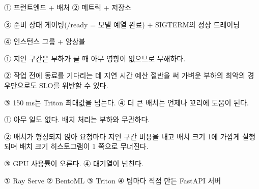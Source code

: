 
\begin{tbboptions}
  \item ① 프런트엔드 + 배처        ② 메트릭 + 저장소
  \item ③ 준비 상태 게이팅(/ready = 모델 예열 완료) + SIGTERM의 정상 드레이닝
  \item ④ 인스턴스 그룹 + 앙상블
\end{tbboptions}


\begin{tbboptions}
  \item ① 지연 구간은 부하가 클 때 아무 영향이 없으므로 무해하다.
  \item ② 작업 전에 동료를 기다리는 데 지연 시간 예산 절반을 써 가벼운 부하의 최악의 경우만으로도 SLO를 위반할 수 있다.
  \item ③ 150 ms는 Triton 최대값을 넘는다.        ④ 더 큰 배치는 언제나 꼬리에 도움이 된다.
\end{tbboptions}


\begin{tbboptions}
  \item ① 아무 일도 없다. 배치 처리는 부하와 무관하다.
  \item ② 배치가 형성되지 않아 요청마다 지연 구간 비용을 내고 배치 크기 1에 가깝게 실행되며 배치 크기 히스토그램이 1 쪽으로 무너진다.
  \item ③ GPU 사용률이 오른다.        ④ 대기열이 넘친다.
\end{tbboptions}


\begin{tbboptions}
  \item ① Ray Serve        ② BentoML        ③ Triton        ④ 팀마다 직접 만든 FastAPI 서버
\end{tbboptions}


